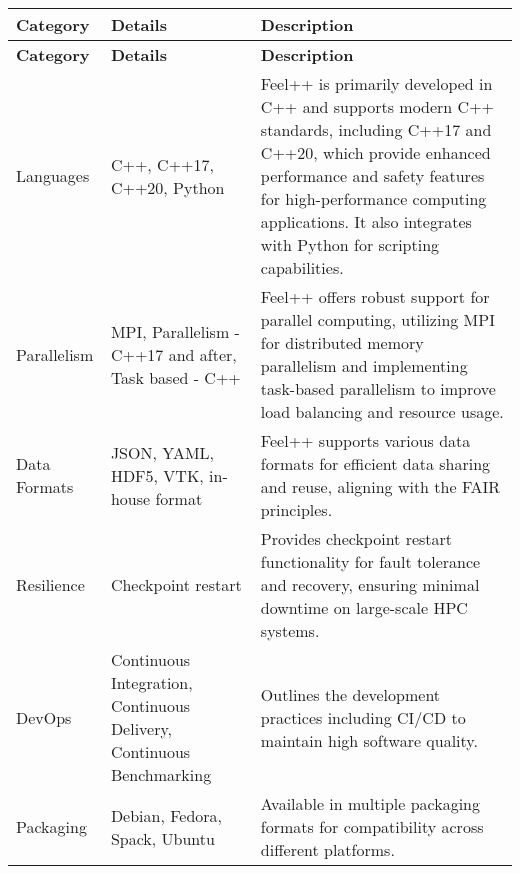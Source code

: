 \begin{longtable}{lp{}p{}}
        \rowcolor{gray}\textbf{\color{white}Category} & \textbf{\color{white}Details} & \textbf{\color{white}Description} \\
        \hline
        \endfirsthead %
        
        \hline
        \rowcolor{gray}\textbf{Category} & \textbf{Details} & \textbf{Description} \\
        \hline
        \endhead %
        
        \hline
        \endfoot %
        
        \hline
        \endlastfoot %
    
        \rowcolor{white}Languages  & C++, C++17, C++20, Python & Feel++ is primarily developed in C++ and supports modern C++ standards, including C++17 and C++20, which provide enhanced performance and safety features for high-performance computing applications. It also integrates with Python for scripting capabilities. \\
        
        \rowcolor{numpexlightergray}Parallelism  & MPI, Parallelism - C++17 and after, Task based - C++ & Feel++ offers robust support for parallel computing, utilizing MPI for distributed memory parallelism and implementing task-based parallelism to improve load balancing and resource usage. \\
        
        \rowcolor{white}Data Formats  & JSON, YAML, HDF5, VTK, in-house format & Feel++ supports various data formats for efficient data sharing and reuse, aligning with the FAIR principles. \\
        
        \rowcolor{numpexlightergray}Resilience  & Checkpoint restart & Provides checkpoint restart functionality for fault tolerance and recovery, ensuring minimal downtime on large-scale HPC systems. \\
        
        \rowcolor{white}DevOps & Continuous Integration, Continuous Delivery, Continuous Benchmarking & Outlines the development practices including CI/CD to maintain high software quality. \\
        
        \rowcolor{numpexlightergray}Packaging  & Debian, Fedora, Spack, Ubuntu & Available in multiple packaging formats for compatibility across different platforms. \\
        

\end{longtable}
